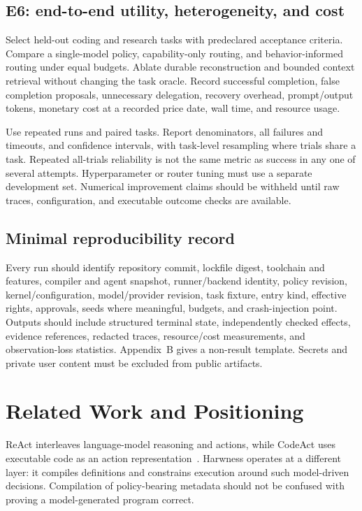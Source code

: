 \subsection{E6: end-to-end utility, heterogeneity, and cost}

Select held-out coding and research tasks with predeclared acceptance criteria. Compare a single-model policy, capability-only routing, and behavior-informed routing under equal budgets. Ablate durable reconstruction and bounded context retrieval without changing the task oracle. Record successful completion, false completion proposals, unnecessary delegation, recovery overhead, prompt/output tokens, monetary cost at a recorded price date, wall time, and resource usage.

Use repeated runs and paired tasks. Report denominators, all failures and timeouts, and confidence intervals, with task-level resampling where trials share a task. Repeated all-trials reliability is not the same metric as success in any one of several attempts. Hyperparameter or router tuning must use a separate development set. Numerical improvement claims should be withheld until raw traces, configuration, and executable outcome checks are available.

\subsection{Minimal reproducibility record}

Every run should identify repository commit, lockfile digest, toolchain and features, compiler and agent snapshot, runner/backend identity, policy revision, kernel/configuration, model/provider revision, task fixture, entry kind, effective rights, approvals, seeds where meaningful, budgets, and crash-injection point. Outputs should include structured terminal state, independently checked effects, evidence references, redacted traces, resource/cost measurements, and observation-loss statistics. Appendix~B gives a non-result template. Secrets and private user content must be excluded from public artifacts.

\section{Related Work and Positioning}
\label{sec:related-work}

ReAct interleaves language-model reasoning and actions, while CodeAct uses executable code as an action representation~\cite{ref1,ref2}. Harwness operates at a different layer: it compiles definitions and constrains execution around such model-driven decisions. Compilation of policy-bearing metadata should not be confused with proving a model-generated program correct.


